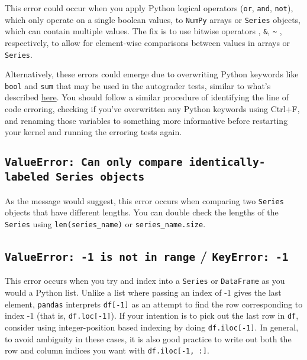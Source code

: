 \documentclass[
  letterpaper,
  DIV=11,
  numbers=noendperiod]{scrreprt}
\begin{document}
This error could occur when you apply Python logical operators
(\texttt{or}, \texttt{and}, \texttt{not}), which only operate on a
single boolean values, to \texttt{NumPy} arrays or \texttt{Series}
objects, which can contain multiple values. The fix is to use bitwise
operators \texttt{\textbar{}}, \texttt{\&}, \texttt{\textasciitilde{}} ,
respectively, to allow for element-wise comparisons between values in
arrays or \texttt{Series}.

Alternatively, these errors could emerge due to overwriting Python
keywords like \texttt{bool} and \texttt{sum} that may be used in the
autograder tests, similar to what's described
\href{https://ds100.org/debugging-guide/pandas/pandas.html\#typeerror-___-object-is-not-callable}{here}.
You should follow a similar procedure of identifying the line of code
erroring, checking if you've overwritten any Python keywords using
Ctrl+F, and renaming those variables to something more informative
before restarting your kernel and running the erroring tests again.

\subsection{\texorpdfstring{\texttt{ValueError:\ Can\ only\ compare\ identically-labeled\ Series\ objects}}{ValueError: Can only compare identically-labeled Series objects}}\label{valueerror-can-only-compare-identically-labeled-series-objects}

As the message would suggest, this error occurs when comparing two
\texttt{Series} objects that have different lengths. You can double
check the lengths of the \texttt{Series} using
\texttt{len(series\_name)} or \texttt{series\_name.size}.

\subsection{\texorpdfstring{\texttt{ValueError:\ -1\ is\ not\ in\ range}
/
\texttt{KeyError:\ -1}}{ValueError: -1 is not in range / KeyError: -1}}\label{valueerror--1-is-not-in-range-keyerror--1}

This error occurs when you try and index into a \texttt{Series} or
\texttt{DataFrame} as you would a Python list. Unlike a list where
passing an index of -1 gives the last element, \texttt{pandas}
interprets \texttt{df{[}-1{]}} as an attempt to find the row
corresponding to index -1 (that is, \texttt{df.loc{[}-1{]}}). If your
intention is to pick out the last row in \texttt{df}, consider using
integer-position based indexing by doing \texttt{df.iloc{[}-1{]}}. In
general, to avoid ambiguity in these cases, it is also good practice to
write out both the row and column indices you want with
\texttt{df.iloc{[}-1,\ :{]}}.
\end{document}
